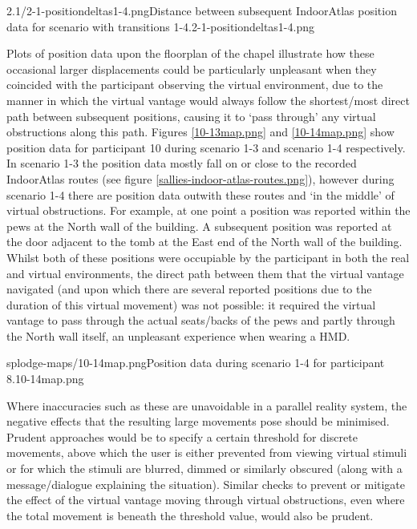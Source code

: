        {2.1/2-1-positiondeltas1-4.png}{Distance between subsequent IndoorAtlas position data for scenario with transitions 1-4.}{2-1-positiondeltas1-4.png}

Plots of position data upon the floorplan of the chapel illustrate how these occasional larger displacements could be particularly unpleasant when they coincided with the participant observing the virtual environment, due to the manner in which the virtual vantage would always follow the shortest/most direct path between subsequent positions, causing it to `pass through' any virtual obstructions along this path. Figures \ref{10-13map.png} and \ref{10-14map.png} show position data for participant 10 during scenario 1-3 and scenario 1-4 respectively. In scenario 1-3 the position data mostly fall on or close to the recorded IndoorAtlas routes (see figure \ref{sallies-indoor-atlas-routes.png}), however during scenario 1-4 there are position data outwith these routes and `in the middle' of virtual obstructions. For example, at one point a position was reported within the pews at the North wall of the building. A subsequent position was reported at the door adjacent to the tomb at the East end of the North wall of the building. Whilst both of these positions were occupiable by the participant in both the real and virtual environments, the direct path between them that the virtual vantage navigated (and upon which there are several reported positions due to the duration of this virtual movement) was not possible: it required the virtual vantage to pass through the actual seats/backs of the pews and partly through the North wall itself, an unpleasant experience when wearing a HMD.

       {splodge-maps/10-14map.png}{Position data during scenario 1-4 for participant 8.}{10-14map.png}

Where inaccuracies such as these are unavoidable in a parallel reality system, the negative effects that the resulting large movements pose should be minimised. Prudent approaches would be to specify a certain threshold for discrete movements, above which the user is either prevented from viewing virtual stimuli or for which the stimuli are blurred, dimmed or similarly obscured (along with a message/dialogue explaining the situation). Similar checks to prevent or mitigate the effect of the virtual vantage moving through virtual obstructions, even where the total movement is beneath the threshold value, would also be prudent.

